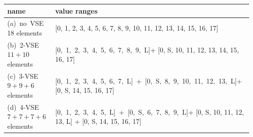 
\begin{table}
 \begin{tabular}{p{100pt}|p{230pt}}
  \hline\hline
   name & value ranges \\
  \hline
   \mbox{(a) no VSE} \break \phantom{(a)} 18 elements &
       [0, 1, 2, 3, 4, 5, 6, 7, 8, 9, 10, 11, 12, 13, 14, 15, 16, 17] \\ \hline
   \mbox{(b) 2-VSE} \break  \phantom{(a)} $11 + 10$ elements &
     \mbox{[0, 1, 2, 3, 4, 5, 6, 7, 8, 9, L]}\break + [0, S, 10, 11, 12, 13, 14, 15, 16, 17] \\ \hline
   \mbox{(c) 3-VSE} \break \phantom{(a)} $9 {+} 9 {+} 6$ elements &
     \mbox{[0, 1, 2, 3, 4, 5, 6, 7, L] + [0, S, 8, 9, 10, 11, 12, 13, L]}\break + [0, S, 14, 15, 16, 17] \\ \hline
   \mbox{(d) 4-VSE} \break \phantom{(a)} $7 {+} 7 {+} 7 {+} 6$ elements &
     \mbox{[0, 1, 2, 3, 4, 5, L] + [0, S, 6, 7, 8, 9, L]}\break + [0, S, 10, 11, 12, 13, L] + [0, S, 14, 15, 16, 17] \\ \hline
 \end{tabular}
\end{table}

